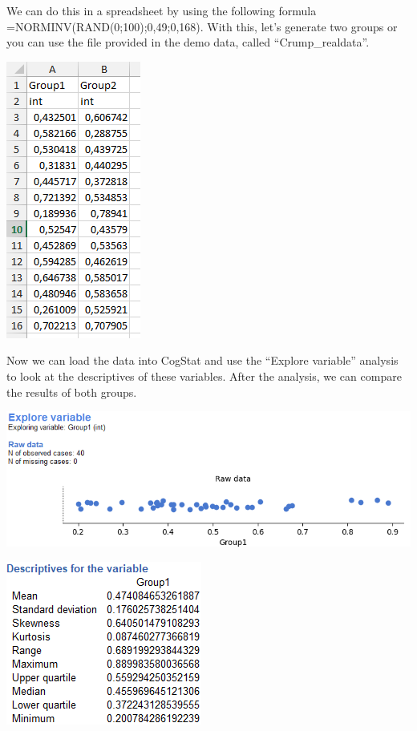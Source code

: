 \documentclass[
]{book}
\begin{document}
We can do this in a spreadsheet by using the following formula =NORMINV(RAND(0;100);0,49;0,168). With this, let's generate two groups or you can use the file provided in the demo data, called ``Crump\_realdata''.

\includegraphics{img/ch5/5.3.4.1.5randGroup12.png}

Now we can load the data into CogStat and use the ``Explore variable'' analysis to look at the descriptives of these variables. After the analysis, we can compare the results of both groups.

\includegraphics{img/ch5/5.3.4.1.5randExpvarrawG1.png}

\includegraphics{img/ch5/5.3.4.1.5descrG1.png}
\end{document}
